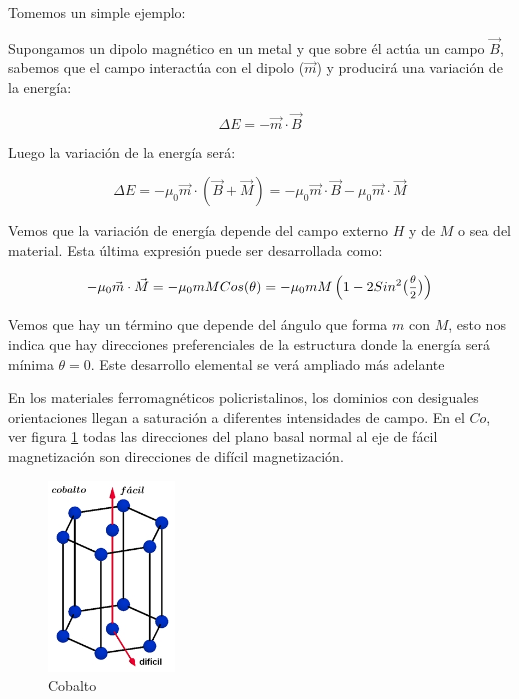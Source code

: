 Tomemos un simple ejemplo:

Supongamos un dipolo magnético en un metal y que sobre él actúa un campo $\vec{B}$, sabemos que el campo interactúa con el dipolo ($\vec{m}$) y producirá una variación de la energía:

\begin{equation}
\Delta E = -\vec{m} \cdot \vec{B}
\end{equation}

Luego la variación de la energía será:

\begin{equation}
\Delta E = -\mu_{0}\vec{m} \cdot (\vec{B} + \vec{M}) = -\mu_{0}\vec{m} \cdot \vec{B} -\mu_{0}\vec{m} \cdot \vec{M}
\end{equation}

Vemos que la variación de energía depende del campo externo $H$ y de $M$ o sea del material. Esta última expresión puede ser desarrollada como:

\begin{equation}
 -\mu_{0}\vec{m} \cdot \vec{M}  = -\mu_{0}m M Cos(\theta) = -\mu_{0}m M \left( 1-2 Sin^{2}\big(\mfrac {\theta}{2}\big) \right)  
\end{equation}

Vemos que hay un término que depende del ángulo que forma $m$ con $M$, esto nos indica que hay direcciones preferenciales de la estructura donde la energía será mínima $\theta = 0$. Este desarrollo elemental se verá ampliado más adelante


En los materiales ferromagnéticos policristalinos, los dominios con desiguales orientaciones llegan a saturación a diferentes intensidades de campo. En el $Co$, ver figura \ref{fig:policristalino3} todas las direcciones del plano basal normal al eje de fácil magnetización son direcciones de difícil magnetización.

\begin{figure}[H]
    \centering
    \includegraphics[width=0.3\textwidth]{./Figures/policristalino3}
	\caption{Cobalto}
	\label{fig:policristalino3}
\end{figure}

